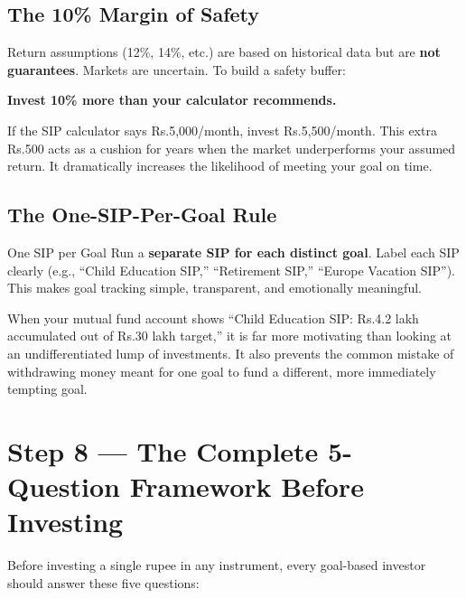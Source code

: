 \documentclass[12pt,a4paper]{article}
\makeatletter
\newcommand{\rupee}{\ifmmode\text{Rs.}\else Rs.\@\fi}
\makeatother
\begin{document}
\subsection{The 10\% Margin of Safety}

\begin{keybox}
Return assumptions (12\%, 14\%, etc.) are based on historical data but are \textbf{not guarantees}. Markets are uncertain. To build a safety buffer:

\medskip
\textbf{Invest 10\% more than your calculator recommends.}

\medskip
If the SIP calculator says \rupee{}5,000/month, invest \rupee{}5,500/month. This extra \rupee{}500 acts as a cushion for years when the market underperforms your assumed return. It dramatically increases the likelihood of meeting your goal on time.
\end{keybox}

\subsection{The One-SIP-Per-Goal Rule}

\begin{definitionbox}{One SIP per Goal}
Run a \textbf{separate SIP for each distinct goal}. Label each SIP clearly (e.g., ``Child Education SIP,'' ``Retirement SIP,'' ``Europe Vacation SIP''). This makes goal tracking simple, transparent, and emotionally meaningful.
\end{definitionbox}

When your mutual fund account shows ``Child Education SIP: \rupee{}4.2 lakh accumulated out of \rupee{}30 lakh target,'' it is far more motivating than looking at an undifferentiated lump of investments. It also prevents the common mistake of withdrawing money meant for one goal to fund a different, more immediately tempting goal.

\section{Step 8 --- The Complete 5-Question Framework Before Investing}

Before investing a single rupee in any instrument, every goal-based investor should answer these five questions:
\end{document}
